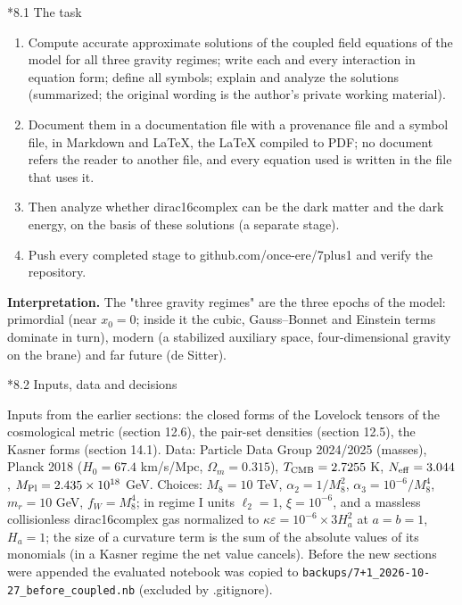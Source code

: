 \documentclass[10pt,a4paper]{article}
\makeatletter
\renewcommand\subsection{\@startsection{subsection}{2}{\z@}{-3.25ex\@plus -1ex \@minus -.2ex}{1.5ex \@plus .2ex}{\normalfont\large\bfseries\raggedright}}
\makeatother
\begin{document}
\subsection*{8.1 The task}
\begin{enumerate}
\item Compute accurate approximate solutions of the coupled field equations of the model for all three gravity regimes; write each and every interaction in equation form; define all symbols; explain and analyze the solutions (summarized; the original wording is the author’s private working material).
\item Document them in a documentation file with a provenance file and a symbol file, in Markdown and LaTeX, the LaTeX compiled to PDF; no document refers the reader to another file, and every equation used is written in the file that uses it.
\item Then analyze whether dirac16complex can be the dark matter and the dark energy, on the basis of these solutions (a separate stage).
\item Push every completed stage to github.com/once-ere/7plus1 and verify the repository.
\end{enumerate}
\textbf{Interpretation.} The "three gravity regimes" are the three epochs of the model: primordial (near $x_0=0$; inside it the cubic, Gauss–Bonnet and Einstein terms dominate in turn), modern (a stabilized auxiliary space, four-dimensional gravity on the brane) and far future (de Sitter).

\subsection*{8.2 Inputs, data and decisions}
Inputs from the earlier sections: the closed forms of the Lovelock tensors of the cosmological metric (section 12.6), the pair-set densities (section 12.5), the Kasner forms (section 14.1). Data: Particle Data Group 2024/2025 (masses), Planck 2018 ($H_0=67.4$ km/s/Mpc, $\Omega_m=0.315$), $T_{\rm CMB}=2.7255$ K, $N_{\rm eff}=3.044$, $M_{\rm Pl}=2.435\times10^{18}$ GeV. Choices: $M_8=10$ TeV, $\alpha_2=1/M_8^2$, $\alpha_3=10^{-6}/M_8^4$, $m_r=10$ GeV, $f_W=M_8^4$; in regime I units $\ell_2=1$, $\xi=10^{-6}$, and a massless collisionless dirac16complex gas normalized to $\kappa\varepsilon=10^{-6}\times3H_a^2$ at $a=b=1$, $H_a=1$; the size of a curvature term is the sum of the absolute values of its monomials (in a Kasner regime the net value cancels). Before the new sections were appended the evaluated notebook was copied to \texttt{backups/\allowbreak{}7+1\_\allowbreak{}2026-10-27\_\allowbreak{}before\_\allowbreak{}coupled.nb} (excluded by .gitignore).
\end{document}
